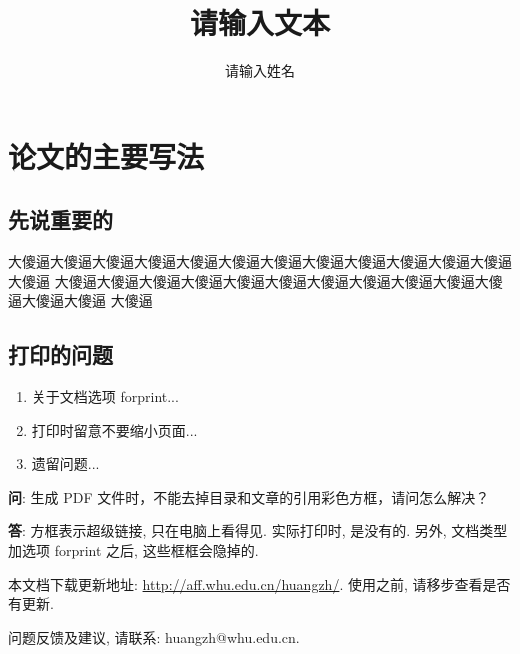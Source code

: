 \documentclass{first} %
\title{请输入文本}
\author{请输入姓名}
\begin{document}
    \maketitle
    \chapter{论文的主要写法}
    \section{先说重要的}
    大傻逼大傻逼大傻逼大傻逼大傻逼大傻逼大傻逼大傻逼大傻逼大傻逼大傻逼大傻逼大傻逼
    大傻逼大傻逼大傻逼大傻逼大傻逼大傻逼大傻逼大傻逼大傻逼大傻逼大傻逼大傻逼大傻逼
    大傻逼

    \section{打印的问题}
    \begin{enumerate}[label=\roman*)]  %
        \item 关于文档选项 forprint... 
        \item 打印时留意不要缩小页面...
        \item 遗留问题...
    \end{enumerate}

\textbf{问}: {\kaishu 生成 PDF 文件时，不能去掉目录和文章的引用彩色方框，请问怎么解决？}

\textbf{答}: {\kaishu 方框表示超级链接, 只在电脑上看得见. 实际打印时, 是没有的. 另外, 文档类型加选项 forprint 之后, 这些框框会隐掉的. }

 \vfill

本文档下载更新地址: \url{http://aff.whu.edu.cn/huangzh/}. 使用之前, 请移步查看是否有更新.

问题反馈及建议, 请联系: huangzh@whu.edu.cn.
\end{document}
